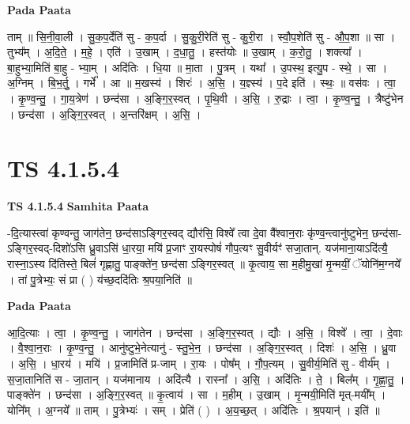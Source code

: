 \documentclass[17pt]{extarticle}
\begin{document}
\textbf{Pada Paata} \newline

ताम् ॥ सि॒नी॒वा॒ली । सु॒क॒प॒र्देति॑ सु - क॒प॒र्दा । सु॒कु॒री॒रेति॑ सु - कु॒री॒रा । स्वौ॒प॒शेति॑ सु - औ॒प॒शा ॥ सा । तुभ्य᳚म् । अ॒दि॒ते॒ । म॒हे॒ । एति॑ । उ॒खाम् । द॒धा॒तु॒ । हस्त॑योः ॥ उ॒खाम् । क॒रो॒तु॒ । शक्त्या᳚ । बा॒हुभ्या॒मिति॑ बा॒हु - भ्या॒म् । अदि॑तिः । धि॒या ॥ मा॒ता । पु॒त्रम् । यथा᳚ । उ॒पस्थ॒ इत्यु॒प - स्थे॒ । सा । अ॒ग्निम् । बि॒भ॒र्तु॒ । गर्भे᳚ । आ ॥ म॒खस्य॑ । शिरः॑ । अ॒सि॒ । य॒ज्ञ्स्य॑ । प॒दे इति॑ । स्थः॒ ॥ वस॑वः । त्वा॒ । कृ॒ण्व॒न्तु॒ । गा॒य॒त्रेण॑ । छन्द॑सा । अ॒ङ्गि॒र॒स्वत् । पृ॒थि॒वी । अ॒सि॒ । रु॒द्राः । त्वा॒ । कृ॒ण्व॒न्तु॒ । त्रैष्टु॑भेन । छन्द॑सा । अ॒ङ्गि॒र॒स्वत् । अ॒न्तरि॑क्षम् । अ॒सि॒ ।  \newline





\section{ TS 4.1.5.4 }

\textbf{TS 4.1.5.4 } \newline
\textbf{Samhita Paata} \newline

-दि॒त्यास्त्वा॑ कृण्वन्तु॒ जाग॑तेन॒ छन्द॑साऽङ्गिर॒स्वद् द्यौर॑सि॒ विश्वे᳚ त्वा दे॒वा वै᳚श्वान॒राः कृ॑ण्व॒न्त्वानु॑ष्टुभेन॒ छन्द॑सा-ऽङ्गिर॒स्वद्-दिशो॑ऽसि ध्रु॒वाऽसि॑ धा॒रया॒ मयि॑ प्र॒जाꣳ रा॒यस्पोषं॑ गौप॒त्यꣳ सु॒वीर्यꣳ॑ सजा॒तान्. यज॑माना॒याऽदि॑त्यै॒ रास्ना॒ऽस्य दि॑तिस्ते॒ बिलं॑ गृह्णातु॒ पाङ्क्ते॑न॒ छन्द॑सा ऽङ्गिर॒स्वत् ॥ कृ॒त्वाय॒ सा म॒हीमु॒खां मृ॒न्मयीं॒ ॅयोनि॑म॒ग्नये᳚ । तां पु॒त्रेभ्यः॒ सं प्रा ( ) य॑च्छ॒ददि॑तिः श्र॒पया॒निति॑ ॥ \newline

\textbf{Pada Paata} \newline

आ॒दि॒त्याः । त्वा॒ । कृ॒ण्व॒न्तु॒ । जाग॑तेन । छन्द॑सा । अ॒ङ्गि॒र॒स्वत् । द्यौः । अ॒सि॒ । विश्वे᳚ । त्वा॒ । दे॒वाः । वै॒श्वा॒न॒राः । कृ॒ण्व॒न्तु॒ । आनु॑ष्टुभे॒नेत्यानु॑ - स्तु॒भे॒न॒ । छन्द॑सा । अ॒ङ्गि॒र॒स्वत् । दिशः॑ । अ॒सि॒ । ध्रु॒वा । अ॒सि॒ । धा॒रय॑ । मयि॑ । प्र॒जामिति॑ प्र-जाम् । रा॒यः । पोष᳚म् । गौ॒प॒त्यम् । सु॒वीर्य॒मिति॑ सु - वीर्य᳚म् । स॒जा॒तानिति॑ स - जा॒तान् । यज॑मानाय । अदि॑त्यै । रास्ना᳚ । अ॒सि॒ । अदि॑तिः । ते॒ । बिल᳚म् । गृ॒ह्णा॒तु॒ । पाङ्क्ते॑न । छन्द॑सा । अ॒ङ्गि॒र॒स्वत् ॥ कृ॒त्वाय॑ । सा । म॒हीम् । उ॒खाम् । मृ॒न्मयी॒मिति॑ मृत्-मयी᳚म् । योनि᳚म् । अ॒ग्नये᳚ ॥ ताम् । पु॒त्रेभ्यः॑ । सम् । प्रेति॑ ( ) । अ॒य॒च्छ॒त् । अदि॑तिः । श्र॒पयान्॑ । इति॑ ॥  \newline
\end{document}
